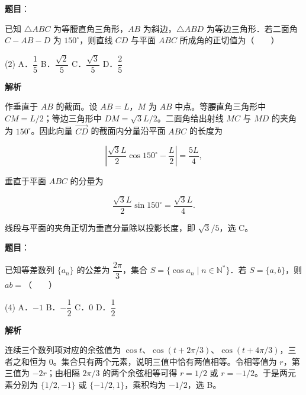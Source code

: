 \begin{answer}

\textbf{题目}：

已知 $\triangle ABC$ 为等腰直角三角形，$AB$ 为斜边，$\triangle ABD$ 为等边三角形．若二面角 $C-AB-D$ 为 $150^\circ$，则直线 $CD$ 与平面 $ABC$ 所成角的正切值为\mbox{（　　）}

\begin{gkopts}(2)
\task A．$\dfrac15$
\task B．$\dfrac{\sqrt2}{5}$
\task C．$\dfrac{\sqrt3}{5}$
\task D．$\dfrac25$
\end{gkopts}

\textbf{解析}

作垂直于 $AB$ 的截面。设 $AB=L$，$M$ 为 $AB$ 中点。等腰直角三角形中 $CM=L/2$；等边三角形中 $DM=\sqrt3L/2$。二面角给出射线 $MC$ 与 $MD$ 的夹角为 $150^\circ$。因此向量 $\overrightarrow{CD}$ 的截面内分量沿平面 $ABC$ 的长度为

\nopagebreak[4]
\[
\left|\frac{\sqrt3L}{2}\cos150^\circ-\frac L2\right|=\frac{5L}{4},
\]

垂直于平面 $ABC$ 的分量为

\nopagebreak[4]
\[
\frac{\sqrt3L}{2}\sin150^\circ=\frac{\sqrt3L}{4}.
\]

线段与平面的夹角正切为垂直分量除以投影长度，即 $\sqrt3/5$，选 C。


\end{answer}
\begin{answer}

\textbf{题目}：

已知等差数列 $\{a_n\}$ 的公差为 $\dfrac{2\pi}{3}$，集合 $S=\{\cos a_n\mid n\in\mathbb N^*\}$．若 $S=\{a,b\}$，则 $ab=$\mbox{（　　）}

\begin{gkopts}(4)
\task A．$-1$
\task B．$-\dfrac12$
\task C．$0$
\task D．$\dfrac12$
\end{gkopts}

\textbf{解析}

连续三个数列项对应的余弦值为 $\cos t$、$\cos(t+2\pi/3)$、$\cos(t+4\pi/3)$，三者之和恒为 $0$。集合只有两个元素，说明三值中恰有两值相等。令相等值为 $r$，第三值为 $-2r$；由相隔 $2\pi/3$ 的两个余弦相等可得 $r=1/2$ 或 $r=-1/2$。于是两元素分别为 $\{1/2,-1\}$ 或 $\{-1/2,1\}$，乘积均为 $-1/2$，选 B。


\end{answer}
